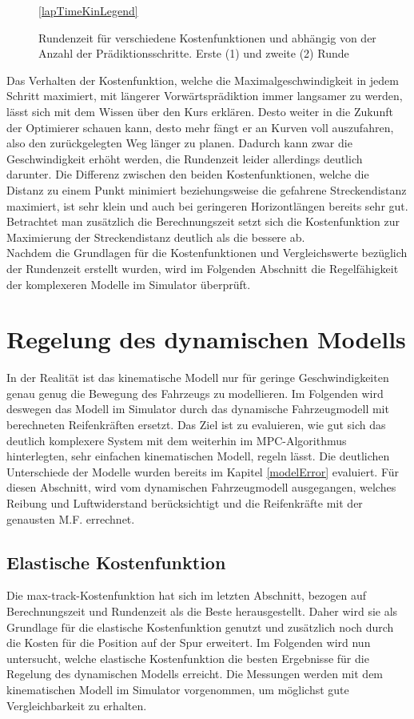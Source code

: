 \documentclass{like}
\begin{document}
\begin{figure}
	\centering
	 
	\ref{lapTimeKinLegend}
	\caption{Rundenzeit für verschiedene Kostenfunktionen und abhängig von der Anzahl der Prädiktionsschritte. Erste (1) und zweite (2) Runde}
	\label{fig:lapTimeKin}
\end{figure}

Das Verhalten der Kostenfunktion, welche die Maximalgeschwindigkeit in jedem Schritt maximiert, mit längerer Vorwärtsprädiktion immer langsamer zu werden, lässt sich mit dem Wissen über den Kurs erklären. Desto weiter in die Zukunft der Optimierer schauen kann, desto mehr fängt er an  Kurven voll auszufahren, also den zurückgelegten Weg länger zu planen. Dadurch kann zwar die Geschwindigkeit erhöht werden, die Rundenzeit leider allerdings deutlich darunter. 
Die Differenz zwischen den beiden Kostenfunktionen, welche die Distanz zu einem Punkt minimiert beziehungsweise die gefahrene Streckendistanz maximiert, ist sehr klein und auch bei geringeren Horizontlängen bereits sehr gut. Betrachtet man zusätzlich die Berechnungszeit setzt sich die Kostenfunktion zur Maximierung der Streckendistanz deutlich als die bessere ab. \\
Nachdem die Grundlagen für die Kostenfunktionen und Vergleichswerte bezüglich der Rundenzeit erstellt wurden, wird im Folgenden Abschnitt die Regelfähigkeit der komplexeren Modelle im Simulator überprüft.

\newpage
\section{Regelung des dynamischen Modells}
\label{dynModelcontrol}
In der Realität ist das kinematische Modell nur für geringe Geschwindigkeiten genau genug die Bewegung des Fahrzeugs zu modellieren. Im Folgenden wird deswegen das Modell im Simulator durch das dynamische Fahrzeugmodell mit berechneten Reifenkräften ersetzt. Das Ziel ist zu evaluieren, wie gut sich das deutlich komplexere System mit dem weiterhin im \ac{MPC}-Algorithmus hinterlegten, sehr einfachen kinematischen Modell, regeln lässt.
Die deutlichen Unterschiede der Modelle wurden bereits im Kapitel \ref{modelError} evaluiert. Für diesen Abschnitt, wird vom dynamischen Fahrzeugmodell ausgegangen, welches Reibung und Luftwiderstand berücksichtigt und die Reifenkräfte mit der genausten \ac{M.F.} errechnet.

\subsection{Elastische Kostenfunktion}
Die max-track-Kostenfunktion hat sich im letzten Abschnitt, bezogen auf Berechnungszeit und Rundenzeit als die Beste herausgestellt. Daher wird sie als Grundlage für die elastische Kostenfunktion genutzt und zusätzlich noch durch die Kosten für die Position auf der Spur erweitert. Im Folgenden wird nun untersucht, welche elastische Kostenfunktion die besten Ergebnisse für die Regelung des dynamischen Modells erreicht. Die Messungen werden mit dem kinematischen Modell im Simulator vorgenommen, um möglichst gute Vergleichbarkeit zu erhalten.
\end{document}
